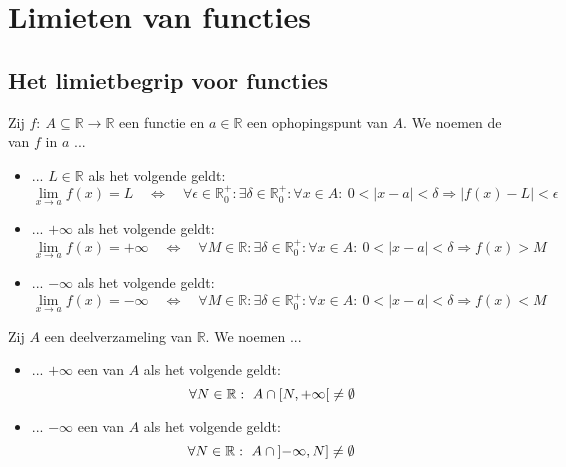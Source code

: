 \documentclass[main.tex]{subfiles}
\begin{document}
\section{Limieten van functies}
\label{sec:limi-van-funct}

\subsection{Het limietbegrip voor functies}

\begin{de}
  Zij $f:\ A \subseteq \mathbb{R} \rightarrow \mathbb{R}$ een functie en $a\in \mathbb{R}$ een ophopingspunt van $A$.
  We noemen de  van $f$ in $a$ ...
  \begin{itemize}
  \item ... $L\in \mathbb{R}$ als het volgende geldt:
    \[
    \lim_{x\rightarrow a}f(x) = L \quad\Leftrightarrow\quad
    \forall \epsilon \in \mathbb{R}_{0}^{+}: \exists \delta \in \mathbb{R}_{0}^{+}: \forall x\in A:\ 0 < |x-a| < \delta \Rightarrow |f(x) - L| < \epsilon
    \]
  \item ... $+\infty$ als het volgende geldt:
    \[
    \lim_{x\rightarrow a}f(x) = +\infty\quad\Leftrightarrow\quad
    \forall M \in \mathbb{R}: \exists \delta \in \mathbb{R}_{0}^{+}: \forall x\in A:\ 0 < |x-a| < \delta \Rightarrow f(x) > M
    \]
  \item ... $-\infty$ als het volgende geldt:
    \[
    \lim_{x\rightarrow a}f(x) = -\infty\quad\Leftrightarrow\quad
    \forall M \in \mathbb{R}: \exists \delta \in \mathbb{R}_{0}^{+}: \forall x\in A:\ 0 < |x-a| < \delta \Rightarrow f(x) < M
    \]
  \end{itemize}
\end{de}

\begin{de}
  Zij $A$ een deelverzameling van $\mathbb{R}$.
  We noemen ...
  \begin{itemize}
  \item ... $+\infty$ een  van $A$ als het volgende geldt:
    \[ \forall N \in \mathbb{R}:\ A \cap \interval[open right]{N}{+\infty} \neq \emptyset \]
  \item ... $-\infty$ een  van $A$ als het volgende geldt:
    \[ \forall N \in \mathbb{R}:\ A \cap \interval[open left]{-\infty}{N} \neq \emptyset \]
  \end{itemize}
\end{de}
\end{document}
